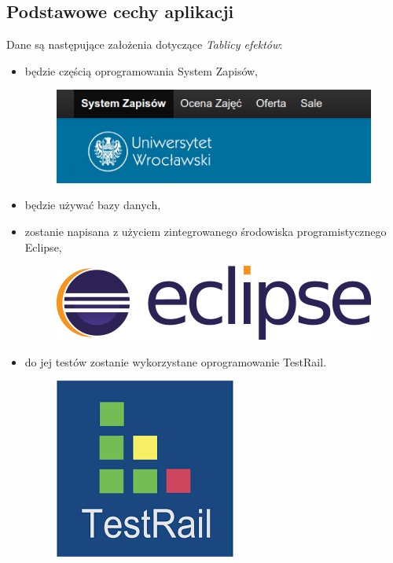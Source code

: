 \documentclass{article}
\begin{document}
\subsection{Podstawowe cechy aplikacji}
Dane są następujące założenia dotyczące \textit{Tablicy efektów}:
\begin{itemize}
  \item będzie częścią oprogramowania System Zapisów,
\begin{figure}[H]
	\begin{center}
		\includegraphics[scale=0.3]{syst.png}
	\end{center}
\end{figure}
 \item będzie używać bazy danych,
 \item zostanie napisana z użyciem zintegrowanego środowiska programistycznego Eclipse,
 \begin{figure}[H]
	\begin{center}
		\includegraphics[scale=0.12]{eclipse.png}
	\end{center}
\end{figure}
 \item do jej testów zostanie wykorzystane oprogramowanie TestRail.
 \begin{figure}[H]
	\begin{center}
		\includegraphics[scale=0.2]{testrail.png}
	\end{center}
\end{figure}
\end{itemize}
\end{document}

